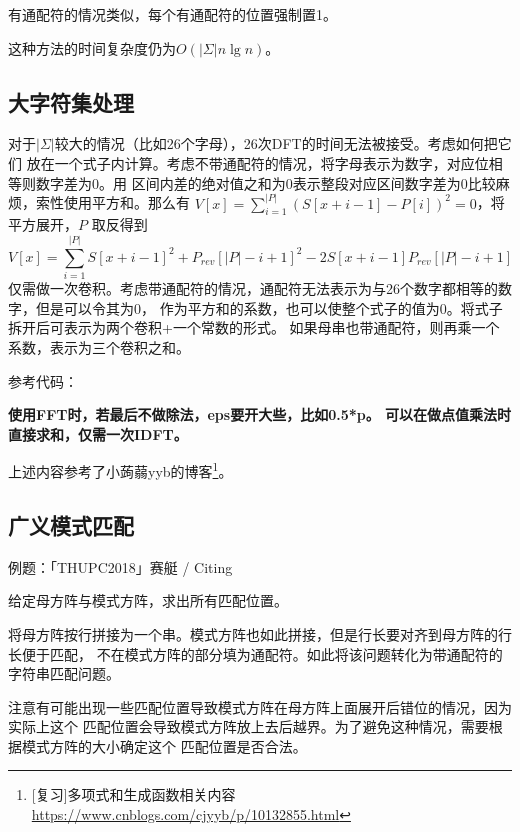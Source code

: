 有通配符的情况类似，每个有通配符的位置强制置1。

这种方法的时间复杂度仍为$O(|\Sigma|n\lg n)$。
\subsection{大字符集处理}
对于$|\Sigma|$较大的情况（比如26个字母），26次DFT的时间无法被接受。考虑如何把它们
放在一个式子内计算。考虑不带通配符的情况，将字母表示为数字，对应位相等则数字差为0。用
区间内差的绝对值之和为0表示整段对应区间数字差为0比较麻烦，索性使用平方和。那么有
$V[x]=\displaystyle \sum_{i=1}^{|P|}{(S[x+i-1]-P[i])^2}=0$，将平方展开，$P$
取反得到
\begin{displaymath}
    V[x]=\displaystyle \sum_{i=1}^{|P|}{S[x+i-1]^2+P_{rev}[|P|-i+1]^2-2S[x+i-1]P_{rev}[|P|-i+1]}
\end{displaymath}
仅需做一次卷积。考虑带通配符的情况，通配符无法表示为与26个数字都相等的数字，但是可以令其为0，
作为平方和的系数，也可以使整个式子的值为0。将式子拆开后可表示为两个卷积+一个常数的形式。
如果母串也带通配符，则再乘一个系数，表示为三个卷积之和。

参考代码：


{\bfseries 使用FFT时，若最后不做除法，eps要开大些，比如0.5*p。
可以在做点值乘法时直接求和，仅需一次IDFT。}

上述内容参考了小蒟蒻yyb的博客\footnote{
    [复习]多项式和生成函数相关内容
    \url{https://www.cnblogs.com/cjyyb/p/10132855.html}
}。

\subsection{广义模式匹配}
例题：「THUPC2018」赛艇 / Citing

给定母方阵与模式方阵，求出所有匹配位置。

将母方阵按行拼接为一个串。模式方阵也如此拼接，但是行长要对齐到母方阵的行长便于匹配，
不在模式方阵的部分填为通配符。如此将该问题转化为带通配符的字符串匹配问题。

注意有可能出现一些匹配位置导致模式方阵在母方阵上面展开后错位的情况，因为实际上这个
匹配位置会导致模式方阵放上去后越界。为了避免这种情况，需要根据模式方阵的大小确定这个
匹配位置是否合法。
